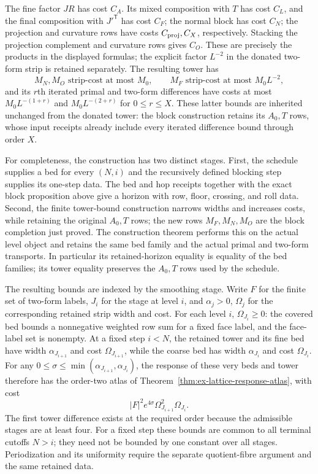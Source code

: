 The fine factor $JR$ has cost $C_A$. Its mixed composition with $T$ has
cost $C_L$, and the final composition with $J'^{\mathsf T}$ has cost
$C_F$; the normal block has cost $C_N$; the projection and curvature rows have
costs $C_{\rm proj},C_X$, respectively. Stacking the projection complement
and curvature rows gives $C_O$. These are precisely the products in the
displayed formulas; the explicit factor $L^{-2}$ in the donated two-form
strip is retained separately. The resulting tower has
\[
 M_N,M_O\text{ strip-cost at most }M_0,
 \qquad M_F\text{ strip-cost at most }M_0L^{-2},
\]
and its $r$th iterated primal and two-form differences have costs at most
$M_0L^{-(1+r)}$ and $M_0L^{-(2+r)}$ for $0\le r\le X$. These latter
bounds are inherited unchanged from the donated tower: the block construction
retains its $A_0,T$ rows, whose input receipts already include every
iterated difference bound through order $X$.

For completeness, the construction has two distinct stages. First, the
schedule supplies a bed for every $(N,i)$ and the recursively defined
blocking step supplies its one-step data. The bed and hop receipts together with
the exact block proposition above give a horizon with row, floor, crossing,
and roll data. Second, the finite tower-bound construction narrows widths
and increases costs, while retaining the original $A_0,T$ rows; the new
rows $M_F,M_N,M_O$ are the block completion just proved. The construction theorem performs this on the actual level object and retains the
same bed family and the actual primal and two-form transports. In
particular its retained-horizon equality is equality of the bed families;
its tower equality preserves the $A_0,T$ rows used by the schedule.

The resulting bounds are indexed by the smoothing stage. Write $F$ for the
finite set of two-form labels, $J_i$ for the stage at level $i$, and
$\alpha_j>0$, $\Omega_j$ for the corresponding retained strip width and
cost. For each level $i$, $\Omega_{J_i}\geq0$: the covered bed bounds a
nonnegative weighted row sum for a fixed face label, and the face-label set
is nonempty. At a fixed step $i<N$, the
retained tower and its fine bed have width $\alpha_{J_{i+1}}$ and cost
$\Omega_{J_{i+1}}$, while the coarse bed has width $\alpha_{J_i}$ and cost
$\Omega_{J_i}$. For any $0\leq\sigma\leq\min(\alpha_{J_{i+1}},
\alpha_{J_i})$, the response of these very beds and tower therefore has
the order-two atlas of Theorem~\ref{thm:ex-lattice-response-atlas}, with
cost
\[
 |F|^2 e^{4\sigma}\Omega_{J_{i+1}}^2\Omega_{J_i}.
\]
The first tower difference exists at the required order because the
admissible stages are at least four. For a fixed step these bounds are
common to all terminal cutoffs $N>i$; they need not be bounded by one
constant over all stages. Periodization and its uniformity require the
separate quotient-fibre argument and the same retained data.


